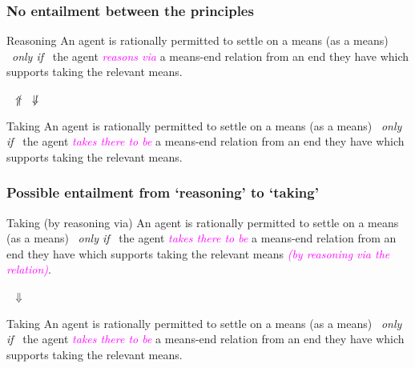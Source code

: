 \documentclass[noamssymb, compress, handout]{beamer} %
\begin{document}
\begin{frame}
  \frametitle{No entailment between the principles}

  \begin{block}{Reasoning}
    An agent is rationally permitted to settle on a means (as a means)
    \newline
    \mbox{ }\hfill\emph{only if}\hfill\mbox{ }
    \newline
    the agent \textcolor{fuchsia}{\emph{reasons via}}  a means-end relation from an end they have which supports taking the relevant means.
  \end{block}

  {\Large \mbox{ }\hfill \(\not\Uparrow\) \qquad \(\not\Downarrow\) \hfill\mbox{ }}

  \begin{block}{Taking}
    An agent is rationally permitted to settle on a means (as a means)
    \newline
    \mbox{ }\hfill\emph{only if}\hfill\mbox{ }
    \newline
    the agent \textcolor{fuchsia}{\emph{takes there to be}} a means-end relation from an end they have which supports taking the relevant means.
  \end{block}

\end{frame}


\begin{frame}
  \frametitle{Possible entailment from `reasoning' to `taking'}

  \begin{block}{Taking (by reasoning via)}
    An agent is rationally permitted to settle on a means (as a means)
    \newline
    \mbox{ }\hfill\emph{only if}\hfill\mbox{ }
    \newline
    the agent \textcolor{fuchsia}{\emph{takes there to be}}  a means-end relation from an end they have which supports taking the relevant means \textcolor{fuchsia}{\emph{(by reasoning via the relation)}}.
  \end{block}

  {\Large \mbox{ }\hfill\(\Downarrow\)\hfill\mbox{ }}

  \begin{block}{Taking}
    An agent is rationally permitted to settle on a means (as a means)
    \newline
    \mbox{ }\hfill\emph{only if}\hfill\mbox{ }
    \newline
    the agent \textcolor{fuchsia}{\emph{takes there to be}} a means-end relation from an end they have which supports taking the relevant means.
  \end{block}

\end{frame}
\end{document}
